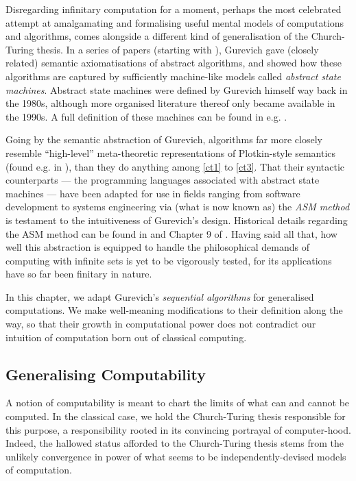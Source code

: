 \documentclass[12pt]{article}
\numberwithin{equation}{section}
\begin{document}
Disregarding infinitary computation for a moment, perhaps the most celebrated attempt at amalgamating and formalising useful mental models of computations and algorithms, comes alongside a different kind of generalisation of the Church-Turing thesis. In a series of papers (starting with \cite{gurevich}), Gurevich gave (closely related) semantic axiomatisations of abstract algorithms, and showed how these algorithms are captured by sufficiently machine-like models called \textit{abstract state machines}. Abstract state machines were defined by Gurevich himself way back in the 1980s, although more organised literature thereof only became available in the 1990s. A full definition of these machines can be found in e.g. \cite{evolvingalg}.

Going by the semantic abstraction of Gurevich, algorithms far more closely resemble ``high-level'' meta-theoretic representations of Plotkin-style semantics (found e.g. in \cite{plotkin}), than they do anything among \ref{ct1} to \ref{ct3}. That their syntactic counterparts --- the programming languages associated with abstract state machines --- have been adapted for use in fields ranging from software development to systems engineering via (what is now known as) the \textit{ASM method} is testament to the intuitiveness of Gurevich's design. Historical details regarding the ASM method can be found in \cite{borger} and Chapter 9 of \cite{borgerbook}. Having said all that, how well this abstraction is equipped to handle the philosophical demands of computing with infinite sets is yet to be vigorously tested, for its applications have so far been finitary in nature.

In this chapter, we adapt Gurevich's \textit{sequential algorithms} for generalised computations. We make well-meaning modifications to their definition along the way, so that their growth in computational power does not contradict our intuition of computation born out of classical computing. 

\subsection{Generalising Computability}\label{subsec22}

A notion of computability is meant to chart the limits of what can and cannot be computed. In the classical case, we hold the Church-Turing thesis responsible for this purpose, a responsibility rooted in its convincing portrayal of computer-hood. Indeed, the hallowed status afforded to the Church-Turing thesis stems from the unlikely convergence in power of what seems to be independently-devised models of computation.
\end{document}
